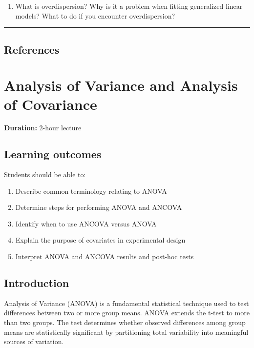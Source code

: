 \documentclass[
]{book}
\providecommand{\tightlist}{%
  \setlength{\itemsep}{0pt}\setlength{\parskip}{0pt}}
\begin{document}
\begin{enumerate}
\def\labelenumi{\arabic{enumi}.}
\setcounter{enumi}{5}
\tightlist
\item
  What is overdispersion? Why is it a problem when fitting generalized linear models? What to do if you encounter overdispersion?
\end{enumerate}

\begin{center}\rule{0.5\linewidth}{0.5pt}\end{center}

\section{References}\label{references-9}

\chapter{Analysis of Variance and Analysis of Covariance}\label{analysis-of-variance-and-analysis-of-covariance}

\textbf{Duration:} 2-hour lecture

\section{Learning outcomes}\label{learning-outcomes-10}

Students should be able to:

\begin{enumerate}
\def\labelenumi{\arabic{enumi}.}
\tightlist
\item
  Describe common terminology relating to ANOVA
\item
  Determine steps for performing ANOVA and ANCOVA
\item
  Identify when to use ANCOVA versus ANOVA
\item
  Explain the purpose of covariates in experimental design
\item
  Interpret ANOVA and ANCOVA results and post-hoc tests
\end{enumerate}

\section{Introduction}\label{introduction-10}

Analysis of Variance (ANOVA) is a fundamental statistical technique used to test differences between two or more group means. ANOVA extends the t-test to more than two groups. The test determines whether observed differences among group means are statistically significant by partitioning total variability into meaningful sources of variation.
\end{document}
